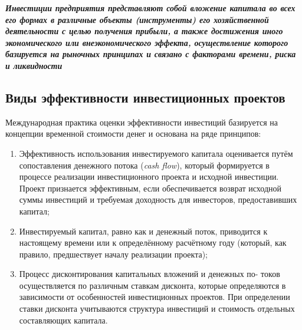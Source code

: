 \documentclass[a4paper,12pt]{article}
\begin{document}
\textbf{\textit{Инвестиции предприятия представляют собой вложение капитала во всех его формах в различные объекты (инструменты) его хозяйственной деятельности с целью получения прибыли, а также достижения иного экономического или внеэкономического эффекта, осуществление которого базируется на рыночных принципах и связано с факторами времени, риска и ликвидности}}  								
	\subsection{Виды эффективности инвестиционных проектов}
Международная практика оценки эффективности инвестиций базируется на концепции временной стоимости денег и основана на ряде
принципов:\\ \medskip
			\begin{enumerate}
				\item Эффективность использования инвестируемого капитала оценивается путём сопоставления денежного потока (\textit{cash flow}), который формируется в процессе реализации инвестиционного проекта и исходной инвестиции. Проект признается эффективным, если обеспечивается возврат
исходной суммы инвестиций и требуемая доходность для инвесторов,
предоставивших капитал;
\item Инвестируемый капитал, равно как и денежный поток, приводится
к настоящему времени или к определённому расчётному году (который,
как правило, предшествует началу реализации проекта);
\item Процесс дисконтирования капитальных вложений и денежных по-
токов осуществляется по различным ставкам дисконта, которые определяются в зависимости от особенностей инвестиционных проектов. При
определении ставки дисконта учитываются структура инвестиций и стоимость отдельных составляющих капитала.\\
\end{enumerate}
\end{document}
